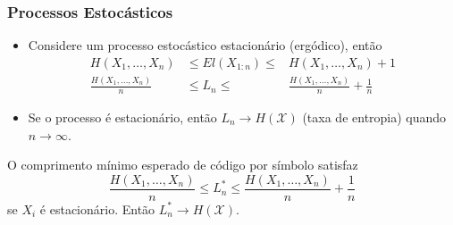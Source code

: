 \begin{frame}[allowframebreaks]
  \frametitle{Processos Estocásticos}
  \begin{itemize}
  \item Considere um processo estocástico estacionário (ergódico), então
	\begin{eqnarray}
	H(X_1,\ldots,X_n) & \leq E l(X_{1:n}) \leq & H(X_1,\ldots,X_n) + 1 \nonumber \\
	\frac{ H(X_1,\ldots,X_n) }{n} & \leq L_n \leq & \frac{ H(X_1,\ldots,X_n) }{n} + \frac{1}{n}
	\end{eqnarray}
  \item Se o processo é estacionário, então $L_n \rightarrow H(\mathcal{X})$ (taxa de entropia) quando $n \rightarrow \infty$.
  \end{itemize}
  \begin{theorem}
  O comprimento mínimo esperado de código por símbolo satisfaz
	\begin{equation}
	\frac{ H(X_1,\ldots,X_n) }{n} \leq L_n^\ast \leq \frac{ H(X_1,\ldots,X_n) }{n} + \frac{1}{n}
	\end{equation}
  se $X_i$ é estacionário. Então $ L_n^\ast \rightarrow H(\mathcal{X})$.
  \end{theorem}
\end{frame}

